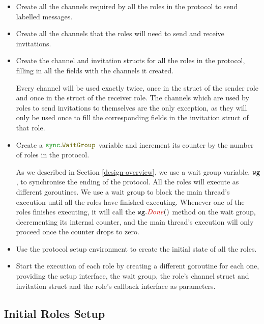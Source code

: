 \documentclass[12pt,twoside]{report}
\begin{document}
\begin{itemize}
    \item Create all the channels required by all the roles in the protocol to send labelled messages. 
    \item Create all the channels that the roles will need to send and receive invitations.
    \item Create the channel and invitation structs for all the roles in the protocol, filling in all the fields with the channels it created. 
    
    Every channel will be used exactly twice, once in the struct of the sender role and once in the struct of the receiver role. The channels which are used by roles to send invitations to themselves are the only exception, as they will only be used once to fill the corresponding fields in the invitation struct of that role.
    \item Create a $\pkgstructaccess{sync}{WaitGroup}$ variable and increment its counter by the number of roles in the protocol.
    
    As we described in Section \ref{design-overview}, we use a wait group variable, ${\mathtt{wg}}$, to synchronise the ending of the protocol. All the roles will execute as different goroutines. We use a wait group to block the main thread's execution until all the roles have finished executing. Whenever one of the roles finishes executing, it will call the $\methodcall{wg}{Done}()$ method on the wait group, decrementing its internal counter, and the main thread's execution will only proceed once the counter drops to zero.

    \item Use the protocol setup environment to create the initial state of all the roles.

    \item Start the execution of each role by creating a different goroutine for each one, providing the setup interface, the wait group, the role's channel struct and invitation struct and the role's callback interface as parameters.
\end{itemize}

\subsection{Initial Roles Setup}
\end{document}
